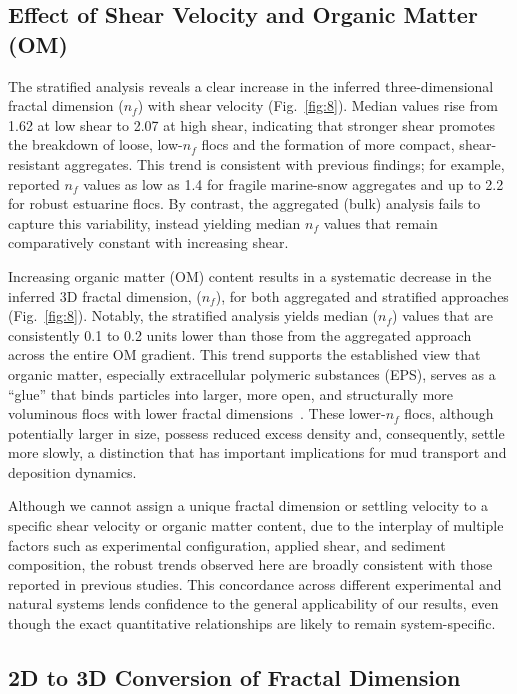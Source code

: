 \documentclass{agujournal2019}
\begin{document}
\subsection{Effect of Shear Velocity and Organic Matter (OM)}

The stratified analysis reveals a clear increase in the inferred three-dimensional fractal dimension (\(n_f\)) with shear velocity (Fig.~\ref{fig:8}). Median values rise from 1.62 at low shear to 2.07 at high shear, indicating that stronger shear promotes the breakdown of loose, low-\(n_f\) flocs and the formation of more compact, shear-resistant aggregates. This trend is consistent with previous findings; for example,  reported \(n_f\) values as low as 1.4 for fragile marine-snow aggregates and up to 2.2 for robust estuarine flocs. By contrast, the aggregated (bulk) analysis fails to capture this variability, instead yielding median \(n_f\) values that remain comparatively constant with increasing shear.

Increasing organic matter (OM) content results in a systematic decrease in the inferred 3D fractal dimension, (\(n_f\)), for both aggregated and stratified approaches (Fig.~\ref{fig:8}). Notably, the stratified analysis yields median (\(n_f\)) values that are consistently 0.1 to 0.2 units lower than those from the aggregated approach across the entire OM gradient. This trend supports the established view that organic matter, especially extracellular polymeric substances (EPS), serves as a ``glue'' that binds particles into larger, more open, and structurally more voluminous flocs with lower fractal dimensions~\cite{nghiem2022mechanistic}. These lower-$n_f$ flocs, although potentially larger in size, possess reduced excess density and, consequently, settle more slowly, a distinction that has important implications for mud transport and deposition dynamics.

Although we cannot assign a unique fractal dimension or settling velocity to a specific shear velocity or organic matter content, due to the interplay of multiple factors such as experimental configuration, applied shear, and sediment composition, the robust trends observed here are broadly consistent with those reported in previous studies. This concordance across different experimental and natural systems lends confidence to the general applicability of our results, even though the exact quantitative relationships are likely to remain system-specific.
\subsection{2D to 3D Conversion of Fractal Dimension}
\end{document}
